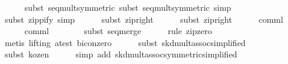 \begin{isabellebody}
\ \ \ \ \isamarkupfalse%
\ {}subst\ seq{}mult{}symmetric{}{}\ subst\ seq{}mult{}symmetric{}{}\ simp{}\isanewline
\ \ \ \ \isamarkupfalse%
\ {}subst\ zippify{}\ simp{}\isanewline
\ \ \ \ \isamarkupfalse%
\ {}subst\ zip{}right{}\isanewline
\ \ \ \ \isamarkupfalse%
\ {}subst\ zip{}right{}\isanewline
\ \ \ \ \isamarkupfalse%
\ {}comml{}\ {}\ {}{}\isanewline
\ \ \ \ \isamarkupfalse%
\ {}comml{}\ {}\ {}{}\isanewline
\ \ \ \ \isamarkupfalse%
\ {}subst\ seq{}merge{}\isanewline
\ \ \ \ \isamarkupfalse%
\ {}rule\ zip{}zero{}\isanewline
\ \ \ \ \isamarkupfalse%
\ {}metis\ {}lifting{}\ a{}test\ bicon{}zero{}\isanewline
\ \ \ \ \isamarkupfalse%
\ {}subst\ skd{}mult{}assoc{}simplified{}{}\isanewline
\ \ \ \ \isamarkupfalse%
\ {}subst\ kozen{}{}\isanewline
\ \ \ \ \isamarkupfalse%
\ {}simp\ add{}\ skd{}mult{}assoc{}symmetric{}simplified{}{}\isanewline

\end{isabellebody}
